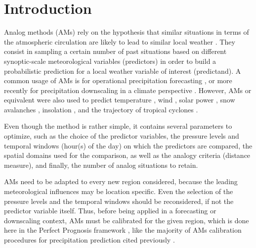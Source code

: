 \documentclass{ametsoc}
\begin{document}


\section{Introduction}
\label{section_intro}

Analog methods (AMs) rely on the hypothesis that similar situations in terms of the atmospheric circulation are likely to lead to similar local weather \citep{Lorenz1956, Lorenz1969, Duband1970, Bontron2005}. They consist in sampling a certain number of past situations based on different synoptic-scale meteorological variables (predictors) in order to build a probabilistic prediction for a local weather variable of interest (predictand). A common usage of AMs is for operational precipitation forecasting \citep[eg.][]{Guilbaud1997, Bontron2005, Hamill2006, Bliefernicht2010, Marty2012, Horton2012, Hamill2015b, BenDaoud2016}, or more recently for precipitation downscaling in a climate perspective \citep[eg.][]{Radanovics2013, Chardon2014, Dayon2015}. However, AMs or equivalent were also used to predict temperature \citep{Radinovic1975, Woodcock1980, Kruizinga1983, DelleMonache2013, Caillouet2016}, wind \citep{Gordon1987, DelleMonache2013, DelleMonache2011, Vanvyve2015, Alessandrini2015, Junk2015, Junk2015c}, solar power \citep{Alessandrini2015a, Bessa2015}, snow avalanches \citep{Obled1980, Bolognesi1993}, insolation \citep{Bois1981}, and the trajectory of tropical cyclones \citep{Keenan1981, Sievers2000, Fraedrich2003}.

Even though the method is rather simple, it contains several parameters to optimize, such as the choice of the predictor variables, the pressure levels and temporal windows (hour(s) of the day) on which the predictors are compared, the spatial domains used for the comparison, as well as the analogy criteria (distance measure), and finally, the number of analog situations to retain. 

AMs need to be adapted to every new region considered, because the leading meteorological influences may be location specific. Even the selection of the pressure levels and the temporal windows should be reconsidered, if not the predictor variable itself. Thus, before being applied in a forecasting or downscaling context, AMs must be calibrated for the given region, which is done here in the Perfect Prognosis framework \citep{Klein1963}, like the majority of AMs calibration procedures for precipitation prediction cited previously \cite[with the exception of][]{Hamill2006,Hamill2015b}.
\end{document}
